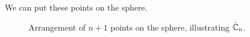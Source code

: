 We can put these points on the sphere.

\begin{figure}[h]
	\centering
	\caption{Arrangement of $n+1$ points on the sphere, illustrating  $\tilde{\mathbb{C}}_n$.}
\end{figure}
